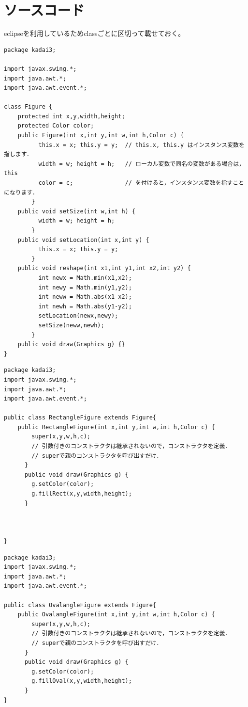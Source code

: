 \documentclass[12pt, a4paper, titlepage]{jsarticle}
\begin{document}
\section{ソースコード}
eclipseを利用しているためclassごとに区切って載せておく。
\begin{screen}
\begin{verbatim}
package kadai3;

import javax.swing.*;
import java.awt.*;
import java.awt.event.*;

class Figure {
	protected int x,y,width,height;
	protected Color color;
	public Figure(int x,int y,int w,int h,Color c) {
		  this.x = x; this.y = y;  // this.x, this.y はインスタンス変数を指します．
		  width = w; height = h;   // ローカル変数で同名の変数がある場合は，this
		  color = c;               // を付けると，インスタンス変数を指すことになります．
		}
	public void setSize(int w,int h) {
		  width = w; height = h;
		}
	public void setLocation(int x,int y) {
		  this.x = x; this.y = y;
		}
	public void reshape(int x1,int y1,int x2,int y2) {
		  int newx = Math.min(x1,x2);
		  int newy = Math.min(y1,y2);
		  int neww = Math.abs(x1-x2);
		  int newh = Math.abs(y1-y2);
		  setLocation(newx,newy);
		  setSize(neww,newh);
		}
	public void draw(Graphics g) {}
}

\end{verbatim}
\end{screen}
\begin{screen}
\begin{verbatim}
package kadai3;
import javax.swing.*;
import java.awt.*;
import java.awt.event.*;

public class RectangleFigure extends Figure{
	public RectangleFigure(int x,int y,int w,int h,Color c) {
	    super(x,y,w,h,c);
	    // 引数付きのコンストラクタは継承されないので，コンストラクタを定義．
	    // superで親のコンストラクタを呼び出すだけ．
	  }
	  public void draw(Graphics g) {
	    g.setColor(color);
	    g.fillRect(x,y,width,height);
	  }

	  
	  
}

\end{verbatim}
\end{screen}
\begin{screen}
\begin{verbatim}
package kadai3;
import javax.swing.*;
import java.awt.*;
import java.awt.event.*;

public class OvalangleFigure extends Figure{
	public OvalangleFigure(int x,int y,int w,int h,Color c) {
	    super(x,y,w,h,c);
	    // 引数付きのコンストラクタは継承されないので，コンストラクタを定義．
	    // superで親のコンストラクタを呼び出すだけ．
	  }
	  public void draw(Graphics g) {
	    g.setColor(color);
	    g.fillOval(x,y,width,height);
	  }
}

\end{verbatim}
\end{screen}
\end{document}
